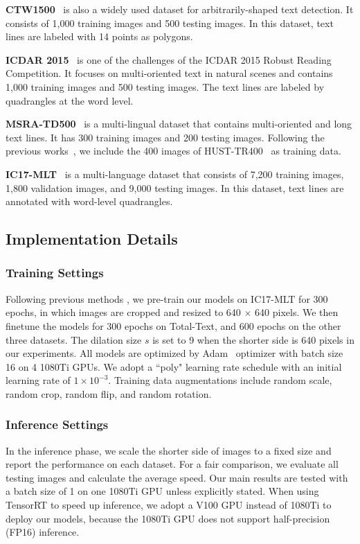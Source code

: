 \documentclass[lettersize,journal]{IEEEtran}
\begin{document}
\noindent \textbf{CTW1500}~\cite{liu2019curved} is also a widely used dataset for arbitrarily-shaped text detection.
It consists of 1,000 training images and 500 testing images. 
In this dataset, text lines are labeled with 14 points as polygons.

\noindent \textbf{ICDAR 2015}~\cite{karatzas2015icdar} is one of the challenges of the ICDAR 2015 Robust Reading Competition. 
It focuses on multi-oriented text in natural scenes and contains 1,000 training images and 500 testing images. 
The text lines are labeled by quadrangles at the word level.

\noindent \textbf{MSRA-TD500}~\cite{yao2012detecting} is a multi-lingual dataset that contains multi-oriented and long text lines. It has 300 training images and 200 testing images. 
Following the previous works~\cite{long2018textsnake,lyu2018multi,zhou2017east}, we include the 400 images of HUST-TR400~\cite{yao2014unified} as training data.

\noindent \textbf{IC17-MLT}~\cite{nayef2017icdar2017} is a multi-language dataset that consists of 7,200 training images, 1,800 validation images, and 9,000 testing images. In this dataset, text lines 
are annotated with word-level quadrangles. 


\subsection{Implementation Details}



\subsubsection{Training Settings} 
Following previous methods \cite{feng2019textdragon,wang2019shape,xie2021polarmask++,xie2019scene}, we pre-train our models on IC17-MLT for 300 epochs, in which images are cropped and resized to 640 $\times$ 640 pixels. 
We then finetune the models for 300 epochs on Total-Text, and 600 epochs on the other three datasets.
The dilation size $s$ is set to 9 when the shorter side is 640 pixels in our experiments.
All models are optimized by Adam~\cite{kingma2014adam} optimizer with batch size 16 on 4 1080Ti GPUs.
We adopt a ``poly" learning rate schedule with an initial learning rate of $1 \times 10^{-3}$.
Training data augmentations include random scale, random crop, random flip, and random rotation.



\subsubsection{Inference Settings}
In the inference phase, we scale the shorter side of images to a fixed size and report the performance on each dataset. 
For a fair comparison, we evaluate all testing images and calculate the average speed.
Our main results are tested with a batch size of 1 on one 1080Ti GPU unless explicitly stated.
When using TensorRT \cite{vanholder2016efficient} to speed up inference, we adopt a V100 GPU instead of 1080Ti to deploy our models, because the 1080Ti GPU does not support half-precision (FP16) inference.
\end{document}
